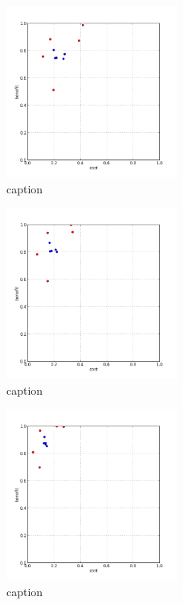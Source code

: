 %
\begin{figure}[!ht]
	\centering
	\includegraphics[width=0.5\textwidth]{img/p1figs/computeFrameStateCummulative_sectionCompareBetter_smooth0_tol12.png}
	\caption{caption}
\end{figure}
%
\begin{figure}[!ht]
	\centering
	\includegraphics[width=0.5\textwidth]{img/p1figs/computeFrameStateCummulative_sectionCompareBetter_smooth0_tol24.png}
	\caption{caption}
\end{figure}
%
\begin{figure}[!ht]
	\centering
	\includegraphics[width=0.5\textwidth]{img/p1figs/computeFrameStateCummulative_sectionCompareBetter_smooth0_tol48.png}
	\caption{caption}
\end{figure}
